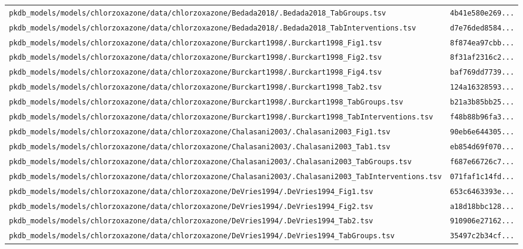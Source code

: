 \documentclass{article}
\begin{document}
\begin{longtable}{ll}
\texttt{pkdb\_models/models/chlorzoxazone/data/chlorzoxazone/Bedada2018/.Bedada2018\_TabGroups.tsv} & \texttt{4b41e580e269...} \\
\texttt{pkdb\_models/models/chlorzoxazone/data/chlorzoxazone/Bedada2018/.Bedada2018\_TabInterventions.tsv} & \texttt{d7e76ded8584...} \\
\texttt{pkdb\_models/models/chlorzoxazone/data/chlorzoxazone/Burckart1998/.Burckart1998\_Fig1.tsv} & \texttt{8f874ea97cbb...} \\
\texttt{pkdb\_models/models/chlorzoxazone/data/chlorzoxazone/Burckart1998/.Burckart1998\_Fig2.tsv} & \texttt{8f31af2316c2...} \\
\texttt{pkdb\_models/models/chlorzoxazone/data/chlorzoxazone/Burckart1998/.Burckart1998\_Fig4.tsv} & \texttt{baf769dd7739...} \\
\texttt{pkdb\_models/models/chlorzoxazone/data/chlorzoxazone/Burckart1998/.Burckart1998\_Tab2.tsv} & \texttt{124a16328593...} \\
\texttt{pkdb\_models/models/chlorzoxazone/data/chlorzoxazone/Burckart1998/.Burckart1998\_TabGroups.tsv} & \texttt{b21a3b85bb25...} \\
\texttt{pkdb\_models/models/chlorzoxazone/data/chlorzoxazone/Burckart1998/.Burckart1998\_TabInterventions.tsv} & \texttt{f48b88b96fa3...} \\
\texttt{pkdb\_models/models/chlorzoxazone/data/chlorzoxazone/Chalasani2003/.Chalasani2003\_Fig1.tsv} & \texttt{90eb6e644305...} \\
\texttt{pkdb\_models/models/chlorzoxazone/data/chlorzoxazone/Chalasani2003/.Chalasani2003\_Tab1.tsv} & \texttt{eb854d69f070...} \\
\texttt{pkdb\_models/models/chlorzoxazone/data/chlorzoxazone/Chalasani2003/.Chalasani2003\_TabGroups.tsv} & \texttt{f687e66726c7...} \\
\texttt{pkdb\_models/models/chlorzoxazone/data/chlorzoxazone/Chalasani2003/.Chalasani2003\_TabInterventions.tsv} & \texttt{071faf1c14fd...} \\
\texttt{pkdb\_models/models/chlorzoxazone/data/chlorzoxazone/DeVries1994/.DeVries1994\_Fig1.tsv} & \texttt{653c6463393e...} \\
\texttt{pkdb\_models/models/chlorzoxazone/data/chlorzoxazone/DeVries1994/.DeVries1994\_Fig2.tsv} & \texttt{a18d18bbc128...} \\
\texttt{pkdb\_models/models/chlorzoxazone/data/chlorzoxazone/DeVries1994/.DeVries1994\_Tab2.tsv} & \texttt{910906e27162...} \\
\texttt{pkdb\_models/models/chlorzoxazone/data/chlorzoxazone/DeVries1994/.DeVries1994\_TabGroups.tsv} & \texttt{35497c2b34cf...} \\

\end{longtable}
\end{document}
